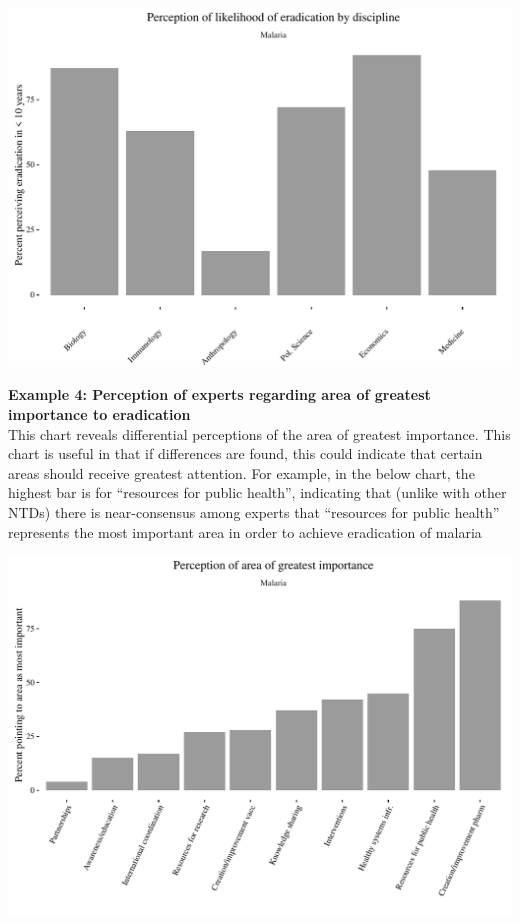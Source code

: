 \documentclass{article}
\begin{document}
\begin{center}
\includegraphics{chart3.pdf}
\end{center}

\newpage
\noindent \textbf{Example 4: Perception of experts regarding area of greatest importance to eradication} \\
\noindent This chart reveals differential perceptions of the area of greatest importance. This chart is useful in that if differences are found, this could indicate that certain areas should receive greatest attention. For example, in the below chart, the highest bar is for “resources for public health”, indicating that (unlike with other NTDs) there is near-consensus among experts that “resources for public health” represents the most important area in order to achieve eradication of malaria

\begin{center}
\includegraphics{chart4.pdf}
\end{center}
\end{document}
